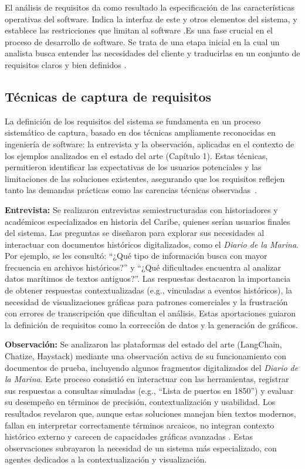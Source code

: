 El análisis de requisitos da como resultado la especificación de las características operativas del software. Indica la interfaz de este y otros elementos del sistema, y establece las restricciones que limitan al software \cite{pressman2010practitioner}.Es una fase crucial en el proceso de desarrollo de software. Se trata de una etapa inicial en la cual un analista busca entender las necesidades del cliente y traducirlas en un conjunto de requisitos claros y bien definidos \cite{palli2023analisis}.

\subsection{Técnicas de captura de requisitos}


La definición de los requisitos del sistema se fundamenta en un proceso sistemático de captura, basado en dos técnicas ampliamente reconocidas en ingeniería de software: la entrevista y la observación, aplicadas en el contexto de los ejemplos analizados en el estado del arte (Capítulo 1). Estas técnicas, permitieron identificar las expectativas de los usuarios potenciales y las limitaciones de las soluciones existentes, asegurando que los requisitos reflejen tanto las demandas prácticas como las carencias técnicas observadas~\cite{sommerville2011software}.

\textbf{Entrevista:} Se realizaron entrevistas semiestructuradas con historiadores y académicos especializados en historia del Caribe, quienes serían usuarios finales del sistema. Las preguntas se diseñaron para explorar sus necesidades al interactuar con documentos históricos digitalizados, como el \textit{Diario de la Marina}. Por ejemplo, se les consultó: ``¿Qué tipo de información busca con mayor frecuencia en archivos históricos?'' y ``¿Qué dificultades encuentra al analizar datos marítimos de textos antiguos?''. Las respuestas destacaron la importancia de obtener respuestas contextualizadas (e.g., vinculadas a eventos históricos), la necesidad de visualizaciones gráficas para patrones comerciales y la frustración con errores de transcripción que dificultan el análisis. Estas aportaciones guiaron la definición de requisitos como la corrección de datos y la generación de gráficos.

\textbf{Observación:} Se analizaron las plataformas del estado del arte (LangChain, Chatize, Haystack) mediante una observación activa de su funcionamiento con documentos de prueba, incluyendo algunos fragmentos digitalizados del \textit{Diario de la Marina}. Este proceso consistió en interactuar con las herramientas, registrar sus respuestas a consultas simuladas (e.g., ``Lista de puertos en 1850'') y evaluar su desempeño en términos de precisión, contextualización y usabilidad. Los resultados revelaron que, aunque estas soluciones manejan bien textos modernos, fallan en interpretar correctamente términos arcaicos, no integran contexto histórico externo y carecen de capacidades gráficas avanzadas \cite{lewis2020retrieval, langchain2023}. Estas observaciones subrayaron la necesidad de un sistema más especializado, con agentes dedicados a la contextualización y visualización.

